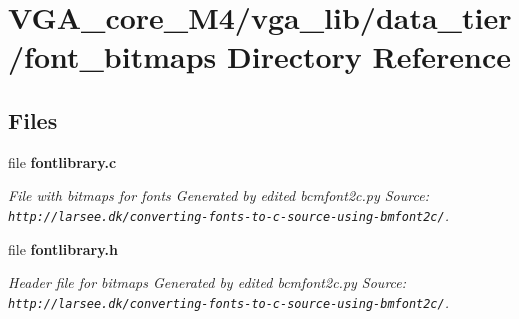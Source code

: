 \section{V\+G\+A\+\_\+core\+\_\+\+M4/vga\+\_\+lib/data\+\_\+tier/font\+\_\+bitmaps Directory Reference}
\label{dir_1dc9ffc195ce94057b2129d4a48e84fc}
\subsection*{Files}
\begin{DoxyCompactItemize}
\item 
file {\bf fontlibrary.\+c}
\begin{DoxyCompactList}\small\item\em File with bitmaps for fonts Generated by edited bcmfont2c.\+py Source\+: {\tt http\+://larsee.\+dk/converting-\/fonts-\/to-\/c-\/source-\/using-\/bmfont2c/}. \end{DoxyCompactList}\item 
file {\bf fontlibrary.\+h}
\begin{DoxyCompactList}\small\item\em Header file for bitmaps Generated by edited bcmfont2c.\+py Source\+: {\tt http\+://larsee.\+dk/converting-\/fonts-\/to-\/c-\/source-\/using-\/bmfont2c/}. \end{DoxyCompactList}\end{DoxyCompactItemize}
